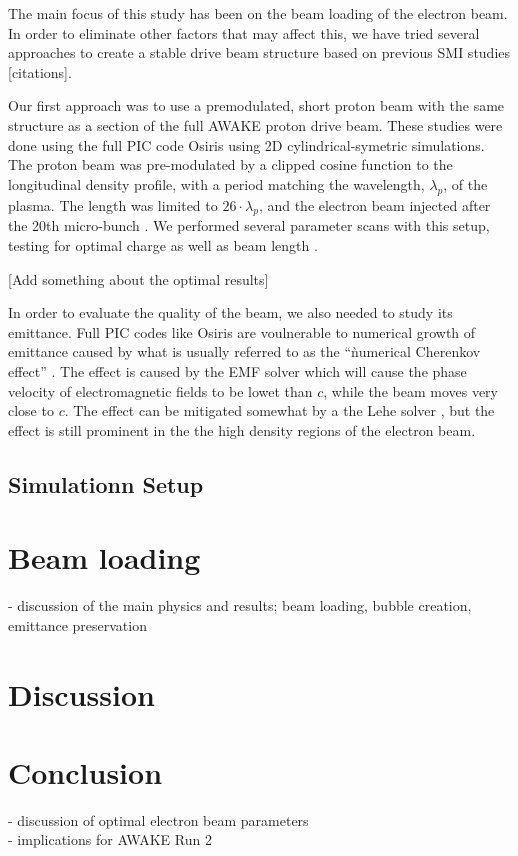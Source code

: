 \documentclass[aps,prstab,reprint,groupedaddress]{revtex4-1}
\begin{document}
The main focus of this study has been on the beam loading of the electron beam. In order to eliminate other factors that may affect this, we have tried several approaches to create a stable drive beam structure based on previous SMI studies [citations].

Our first approach was to use a premodulated, short proton beam with the same structure as a section of the full AWAKE proton drive beam. These studies were done using the full PIC code Osiris \cite{fonseca_osiris:_2002} using 2D cylindrical-symetric simulations. The proton beam was pre-modulated by a clipped cosine function to the longitudinal density profile, with a period matching the wavelength, $\lambda_p$, of the plasma. The length was limited to $26\cdot\lambda_p$, and the electron beam injected after the 20th micro-bunch \cite{berglyd_olsen_loading_2015}. We performed several parameter scans with this setup, testing for optimal charge as well as beam length \cite{adli_towards_2016, berglyd_olsen_loading_2016}.

[Add something about the optimal results]

In order to evaluate the quality of the beam, we also needed to study its emittance. Full PIC codes like Osiris are voulnerable to numerical growth of emittance caused by what is usually referred to as the ``ǹumerical Cherenkov effect'' \cite{godfrey_numerical_1974}. The effect is caused by the EMF solver which will cause the phase velocity of electromagnetic fields to be lowet than $c$, while the beam moves very close to $c$. The effect can be mitigated somewhat by a the Lehe solver \cite{lehe_numerical_2013}, but the effect is still prominent in the the high density regions of the electron beam.

\subsection[\label{S:M:Setup}]{Simulationn Setup}



\section[\label{S:BL}]{Beam loading}

- discussion of the main physics and results; beam loading, bubble creation, emittance preservation \\

\section[\label{S:D}]{Discussion}
\section[\label{S:C}]{Conclusion}

- discussion of optimal electron beam parameters \\
- implications for AWAKE Run 2 \\



\end{document}
